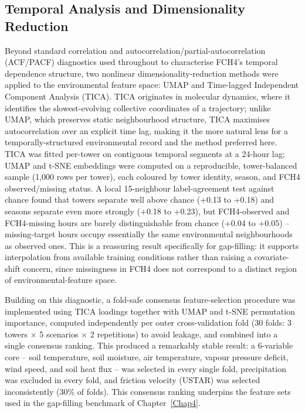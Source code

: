 
\subsection{Temporal Analysis and Dimensionality Reduction}

Beyond standard correlation and autocorrelation/partial-autocorrelation (ACF/PACF) diagnostics used
throughout to characterise FCH4's temporal dependence structure, two nonlinear
dimensionality-reduction methods were applied to the environmental feature space: UMAP and Time-lagged
Independent Component Analysis (TICA). TICA originates in molecular dynamics, where it identifies
the slowest-evolving collective coordinates of a trajectory; unlike UMAP, which preserves static
neighbourhood structure, TICA maximises autocorrelation over an explicit time lag, making it the
more natural lens for a temporally-structured environmental record and the method preferred here.
TICA was fitted per-tower on contiguous temporal segments at a 24-hour lag; UMAP and t-SNE
embeddings were computed on a reproducible, tower-balanced sample (1,000 rows per tower), each
coloured by tower identity, season, and FCH4 observed/missing status. A local 15-neighbour
label-agreement test against chance found that towers separate well above chance (+0.13 to +0.18)
and seasons separate even more strongly (+0.18 to +0.23), but FCH4-observed and FCH4-missing hours
are barely distinguishable from chance (+0.04 to +0.05) -- missing-target hours occupy essentially
the same environmental neighbourhoods as observed ones. This is a reassuring result specifically
for gap-filling: it supports interpolation from available training conditions rather than raising a
covariate-shift concern, since missingness in FCH4 does not correspond to a distinct region of
environmental-feature space.

Building on this diagnostic, a fold-safe consensus feature-selection procedure was implemented
using TICA loadings together with UMAP and t-SNE permutation importance, computed independently
per outer cross-validation fold (30 folds: 3 towers $\times$ 5 scenarios $\times$ 2 repetitions) to
avoid leakage, and combined into a single consensus ranking. This produced a remarkably stable
result: a 6-variable core -- soil temperature, soil moisture, air temperature, vapour pressure
deficit, wind speed, and soil heat flux -- was selected in every single fold, precipitation was
excluded in every fold, and friction velocity (USTAR) was selected inconsistently (30\% of folds).
This consensus ranking underpins the feature sets used in the gap-filling benchmark of
Chapter~\ref{Chap4}.

